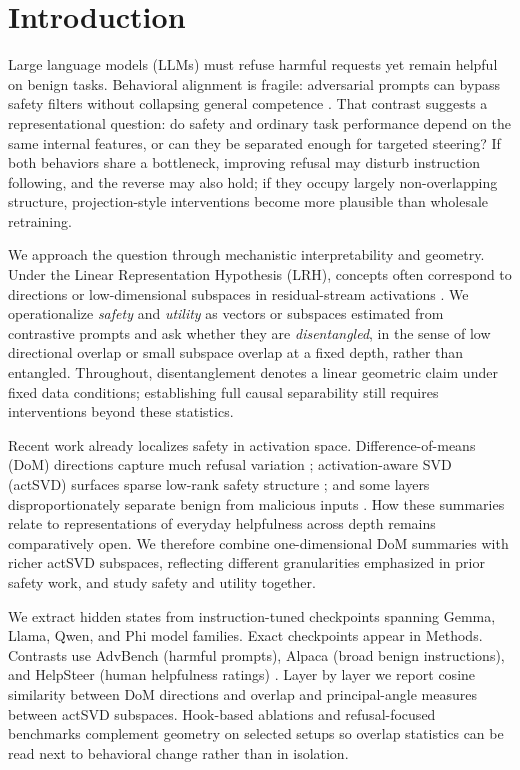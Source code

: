 \section{Introduction}

Large language models (LLMs) must refuse harmful requests yet remain helpful on benign tasks.
Behavioral alignment is fragile: adversarial prompts can bypass safety filters without collapsing general competence \cite{zou2023gcg}.
That contrast suggests a representational question: do safety and ordinary task performance depend on the same internal features, or can they be separated enough for targeted steering?
If both behaviors share a bottleneck, improving refusal may disturb instruction following, and the reverse may also hold; if they occupy largely non-overlapping structure, projection-style interventions become more plausible than wholesale retraining.

We approach the question through mechanistic interpretability and geometry.
Under the Linear Representation Hypothesis (LRH), concepts often correspond to directions or low-dimensional subspaces in residual-stream activations \cite{park2023LRH}.
We operationalize \emph{safety} and \emph{utility} as vectors or subspaces estimated from contrastive prompts and ask whether they are \emph{disentangled}, in the sense of low directional overlap or small subspace overlap at a fixed depth, rather than entangled.
Throughout, disentanglement denotes a linear geometric claim under fixed data conditions; establishing full causal separability still requires interventions beyond these statistics.

Recent work already localizes safety in activation space.
Difference-of-means (DoM) directions capture much refusal variation \cite{arditi2024refusal}; activation-aware SVD (actSVD) surfaces sparse low-rank safety structure \cite{wei2024brittleness}; and some layers disproportionately separate benign from malicious inputs \cite{li2025safety}.
How these summaries relate to representations of everyday helpfulness across depth remains comparatively open.
We therefore combine one-dimensional DoM summaries with richer actSVD subspaces, reflecting different granularities emphasized in prior safety work, and study safety and utility together.

We extract hidden states from instruction-tuned checkpoints spanning Gemma, Llama, Qwen, and Phi model families.
Exact checkpoints appear in Methods.
Contrasts use AdvBench (harmful prompts), Alpaca (broad benign instructions), and HelpSteer (human helpfulness ratings) \cite{wang-etal-2024-helpsteer}.
Layer by layer we report cosine similarity between DoM directions and overlap and principal-angle measures between actSVD subspaces.
Hook-based ablations and refusal-focused benchmarks complement geometry on selected setups so overlap statistics can be read next to behavioral change rather than in isolation.

